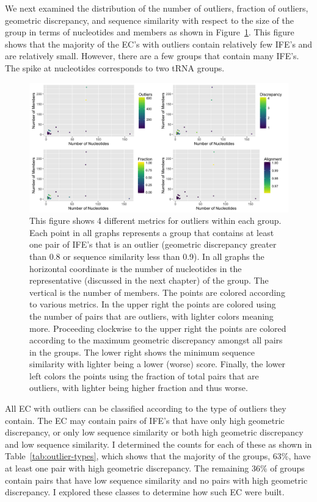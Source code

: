 We next examined the distribution of the number of outliers, fraction of
outliers, geometric discrepancy, and sequence similarity with respect to the
size of the group in terms of nucleotides and members as shown in
Figure~\ref{fig:outlier-detail}. This figure shows that the majority of the EC's
with outliers contain relatively few IFE's and are relatively small. However,
there are a few groups that contain many IFE's. The spike at 
nucleotides corresponds to two tRNA groups.

\begin{figure}[h]
  \includegraphics[width=\textwidth]{chapter-3/figs/outlier-details}
  \caption{This figure shows 4 different metrics for outliers within each group.
    Each point in all graphs represents a group that contains at least one pair
    of IFE's that is an outlier (geometric discrepancy greater than 0.8 or sequence
    similarity less than 0.9). In all graphs the horizontal coordinate is the
    number of nucleotides in the representative (discussed in the next chapter)
    of the group. The vertical is the number of members. The points are colored
    according to various metrics. In the upper right the points are colored
    using the number of pairs that are outliers, with lighter colors meaning
    more. Proceeding clockwise to the upper right the points are colored
    according to the maximum geometric discrepancy amongst all pairs in the groups.
    The lower right shows the minimum sequence similarity with lighter being a
    lower (worse) score. Finally, the lower left colors the points using the
    fraction of total pairs that are outliers, with lighter being higher
  fraction and thus worse.}
\label{fig:outlier-detail}
\end{figure}

All EC with outliers can be classified according to the type of outliers they
contain. The EC may contain pairs of IFE's that have only high geometric
discrepancy, or only low sequence similarity or both high geometric discrepancy
and low sequence similarity. I determined the counts for each of these as shown
in Table~\ref{tab:outlier-types}, which shows that the majority of the groups,
63\%, have at least one pair with high geometric discrepancy. The remaining 36\%
of groups contain pairs that have low sequence similarity and no pairs with high
geometric discrepancy. I explored these classes to determine how such EC were
built.

